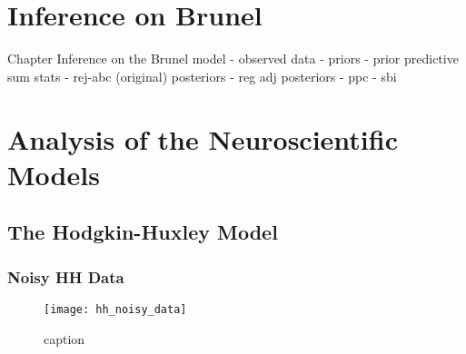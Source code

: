 
\chapter{Inference on Brunel}\label{chap:res_brunel}

Chapter Inference on the Brunel model
- observed data 
- priors
- prior predictive sum stats 
- rej-abc (original) posteriors 
- reg adj posteriors
- ppc 
- sbi



\chapter{Analysis of the Neuroscientific Models}


\section{The Hodgkin-Huxley Model}




\subsection{Noisy HH Data}

\begin{figure}[H]
    \centering
    \texttt{[image: hh\_noisy\_data]}
    \caption{caption}
    \label{fig:fig1}
\end{figure} 



